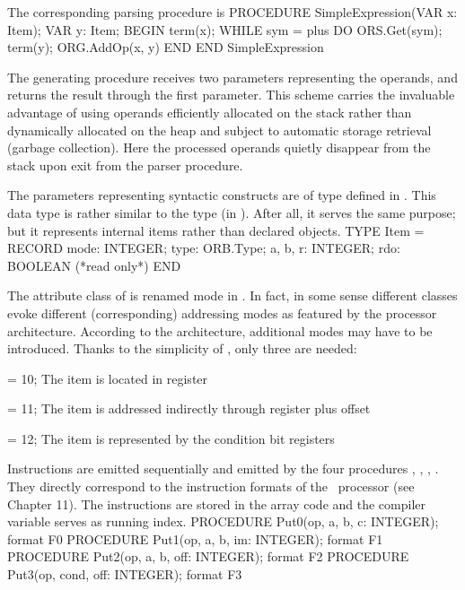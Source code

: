 \noindent The corresponding parsing procedure is
\begintt
PROCEDURE SimpleExpression(VAR x: Item);
  VAR y: Item;
BEGIN term(x);
  WHILE sym = plus DO ORS.Get(sym); term(y); ORG.AddOp(x, y)
  END
END SimpleExpression
\endtt

\noindent The generating procedure  receives two parameters representing the oper\-ands, and returns the result through the first parameter. This scheme carries the invaluable advantage of using operands efficiently allocated on the stack rather than dynamically allocated on the heap and subject to automatic storage retrieval (garbage collection). Here the processed operands quietly disappear from the stack upon exit from the parser procedure.

The parameters representing syntactic constructs are of type  defined in . This data type is rather similar to the type  (in ). After all, it serves the same purpose; but it represents internal items rather than declared objects.
\begintt
TYPE Item = RECORD
  mode: INTEGER;
  type: ORB.Type;
  a, b, r: INTEGER;
  rdo: BOOLEAN (*read only*)
END
\endtt

\noindent The attribute class of  is renamed mode in . In fact, in some sense different classes evoke different (corresponding) addressing modes as featured by the processor architecture. According to the architecture, additional modes may have to be introduced. Thanks to the simplicity of \RISC, only three are needed:

\item{\bullet}  = 10; The item  is located in register 
\item{\bullet}  = 11; The item  is addressed indirectly through register  plus offset 
\item{\bullet}  = 12; The item is represented by the condition bit registers

\noindent Instructions are emitted sequentially and emitted by the four procedures , , , . They directly correspond to the instruction formats of the \RISC\ processor (see Chapter 11). The instructions are stored in the array code and the compiler variable  serves as running index.
\begintt
PROCEDURE Put0(op, a, b, c: INTEGER); format F0
PROCEDURE Put1(op, a, b, im: INTEGER); format F1
PROCEDURE Put2(op, a, b, off: INTEGER); format F2
PROCEDURE Put3(op, cond, off: INTEGER); format F3
\endtt

